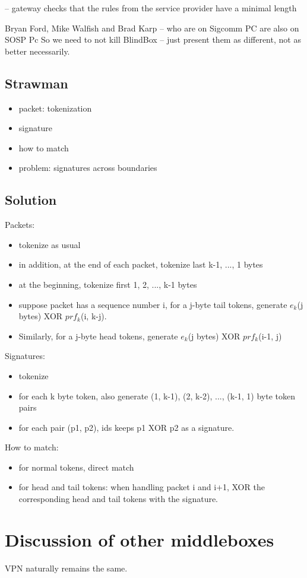 -- gateway checks that the rules from the service provider have a minimal length 

Bryan Ford, Mike Walfish and Brad Karp -- who are on Sigcomm PC are also on SOSP Pc
So we need to not kill BlindBox -- just present them as different, not as better necessarily.


\subsection{Strawman}
\begin{itemize}
\item packet: tokenization
\item signature
\item how to match
\item problem: signatures across boundaries
\end{itemize}

\subsection{Solution}
Packets:
\begin{itemize}
\item tokenize as usual
\item in addition, at the end of each packet, tokenize last k-1, ..., 1 bytes
\item at the beginning, tokenize first 1, 2, ..., k-1 bytes
\item suppose packet has a sequence number i, for a j-byte tail tokens, generate $e_k$(j bytes) XOR $prf_k$(i, k-j).
\item Similarly, for a j-byte head tokens, generate $e_k$(j bytes) XOR $prf_k$(i-1, j)
\end{itemize}

Signatures:
\begin{itemize}
\item tokenize
\item for each k byte token, also generate (1, k-1), (2, k-2), ..., (k-1, 1) byte token pairs
\item for each pair (p1, p2), ids keeps p1 XOR p2 as a signature.
\end{itemize}

How to match:
\begin{itemize}
\item for normal tokens, direct match
\item for head and tail tokens: when handling packet i and i+1, XOR the corresponding head and tail tokens with the signature.
\end{itemize}




\section{Discussion of other middleboxes}\label{sec:vpn} \label{sec:other} \label{sec:not_supp}


VPN naturally remains the same. 
